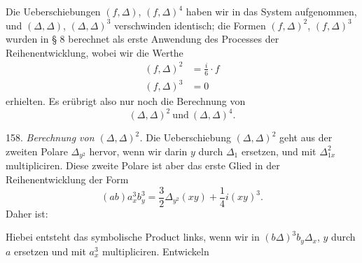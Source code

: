 Die Ueberschiebungen $(f,\Delta)$, $(f,\Delta)^4$ haben wir in das System aufgenommen, und $(\Delta,\Delta)$, $(\Delta,\Delta)^3$ verschwinden identisch; die Formen $(f,\Delta)^2$, $(f,\Delta)^3$ wurden in § 8 berechnet als erste Anwendung des Processes der Reihenentwicklung, wobei wir die Werthe
\[
\begin{aligned}
(f,\Delta)^2&=\frac{i}{6}\cdot f\\
(f,\Delta)^3&=0
\end{aligned}
\]
erhielten. Es erübrigt also nur noch die Berechnung von
\[
(\Delta,\Delta)^2\ \text{und}\ (\Delta,\Delta)^4.
\]

158. \textit{Berechnung von $(\Delta,\Delta)^2$.} Die Ueberschiebung $(\Delta,\Delta)^2$ geht aus der zweiten Polare $\Delta_{y^2}$ hervor, wenn wir darin $y$ durch $\Delta_1$ ersetzen, und mit $\Delta_{1x}^2$ multipliciren. Diese zweite Polare ist aber das erste Glied in der Reihenentwicklung der Form
\[
(ab)a_x^3b_y^3=\frac{3}{2}\Delta_{y^2}(xy)+\frac{1}{4}i(xy)^3.
\]
Daher ist:

Hiebei entsteht das symbolische Product links, wenn wir in $(b\Delta)^3b_y\Delta_x$, $y$ durch $a$ ersetzen und mit $a_x^3$ multipliciren. Entwickeln


